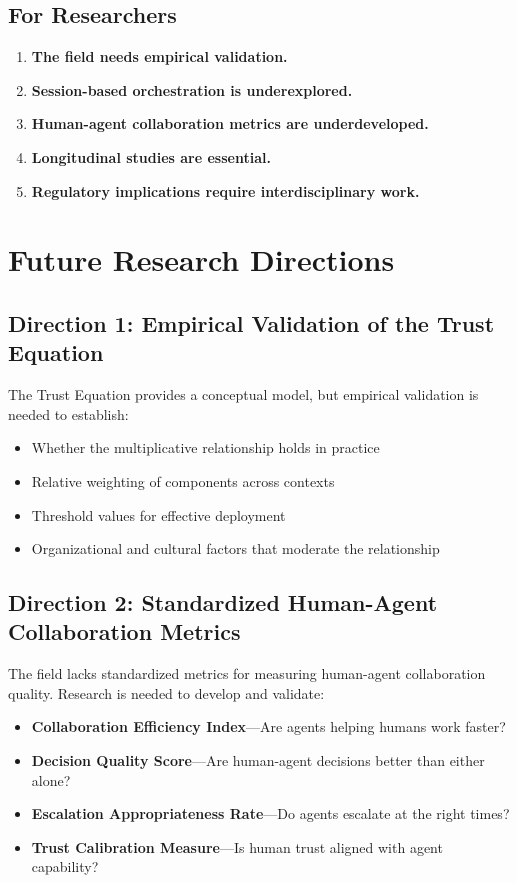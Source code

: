 \subsection{For Researchers}
\label{subsec:for-researchers}

\begin{enumerate}
    \item \textbf{The field needs empirical validation.}
    \item \textbf{Session-based orchestration is underexplored.}
    \item \textbf{Human-agent collaboration metrics are underdeveloped.}
    \item \textbf{Longitudinal studies are essential.}
    \item \textbf{Regulatory implications require interdisciplinary work.}
\end{enumerate}

\section{Future Research Directions}
\label{sec:future-directions}

\subsection{Direction 1: Empirical Validation of the Trust Equation}
\label{subsec:direction1}

The Trust Equation provides a conceptual model, but empirical validation is needed to establish:
\begin{itemize}
    \item Whether the multiplicative relationship holds in practice
    \item Relative weighting of components across contexts
    \item Threshold values for effective deployment
    \item Organizational and cultural factors that moderate the relationship
\end{itemize}

\subsection{Direction 2: Standardized Human-Agent Collaboration Metrics}
\label{subsec:direction2}

The field lacks standardized metrics for measuring human-agent collaboration quality. Research is needed to develop and validate:
\begin{itemize}
    \item \textbf{Collaboration Efficiency Index}---Are agents helping humans work faster?
    \item \textbf{Decision Quality Score}---Are human-agent decisions better than either alone?
    \item \textbf{Escalation Appropriateness Rate}---Do agents escalate at the right times?
    \item \textbf{Trust Calibration Measure}---Is human trust aligned with agent capability?
\end{itemize}

